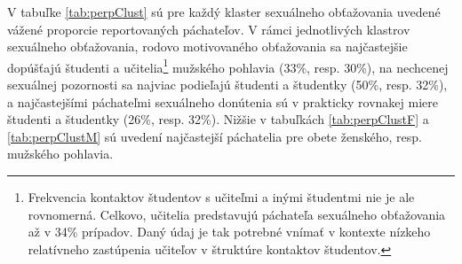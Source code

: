 \documentclass[
]{article}
\begin{document}
\begin{table}[H]

\caption{\label{tab:perpClust}Najčastejší páchatelia celkovo - klastre}
\centering
{}
\end{table}

V tabuľke \ref{tab:perpClust} sú pre každý klaster sexuálneho obťažovania uvedené vážené proporcie reportovaných páchateľov. V rámci jednotlivých klastrov sexuálneho obťažovania, rodovo motivovaného obťažovania sa najčastejšie dopúšťajú študenti a učitelia\footnote{Frekvencia kontaktov študentov s učiteľmi a inými študentmi nie je ale rovnomerná. Celkovo, učitelia predstavujú páchateľa sexuálneho obťažovania až v 34\% prípadov. Daný údaj je tak potrebné vnímať v kontexte nízkeho relatívneho zastúpenia učiteľov v štruktúre kontaktov študentov.} mužského pohlavia (33\%, resp. 30\%), na nechcenej sexuálnej pozornosti sa najviac podieľajú študenti a študentky (50\%, resp. 32\%), a najčastejšími páchateľmi sexuálneho donútenia sú v prakticky rovnakej miere študenti a študentky (26\%, resp. 32\%). Nižšie v tabuľkách \ref{tab:perpClustF} a \ref{tab:perpClustM} sú uvedení najčastejší páchatelia pre obete ženského, resp. mužského pohlavia.
\end{document}
